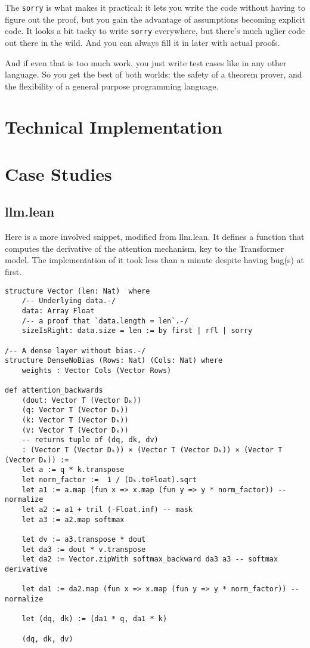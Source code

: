 \documentclass{article}
\begin{document}
The \texttt{sorry} is what makes it practical: it lets you write the code without having to figure out the proof, but you gain the advantage of assumptions becoming explicit code. It looks a bit tacky to write \texttt{sorry} everywhere, but there's much uglier code out there in the wild. And you can always fill it in later with actual proofs.

And if even that is too much work, you just write test cases like in any other language. So you get the best of both worlds: the safety of a theorem prover, and the flexibility of a general purpose programming language.

\section{Technical Implementation}

\section{Case Studies}
\subsection{llm.lean}
Here is a more involved snippet, modified from llm.lean. It defines a function that computes the derivative of the attention mechanism, key to the Transformer model. The implementation of it took less than a minute despite having bug(s) at first.

\begin{verbatim}
structure Vector (len: Nat)  where
    /-- Underlying data.-/
    data: Array Float
    /-- a proof that `data.length = len`.-/
    sizeIsRight: data.size = len := by first | rfl | sorry

/-- A dense layer without bias.-/
structure DenseNoBias (Rows: Nat) (Cols: Nat) where
    weights : Vector Cols (Vector Rows)

def attention_backwards
    (dout: Vector T (Vector Dₖ))
    (q: Vector T (Vector Dₖ))
    (k: Vector T (Vector Dₖ))
    (v: Vector T (Vector Dₖ))
    -- returns tuple of (dq, dk, dv)
    : (Vector T (Vector Dₖ)) × (Vector T (Vector Dₖ)) × (Vector T (Vector Dₖ)) :=
    let a := q * k.transpose
    let norm_factor :=  1 / (Dₖ.toFloat).sqrt
    let a1 := a.map (fun x => x.map (fun y => y * norm_factor)) -- normalize
    let a2 := a1 + tril (-Float.inf) -- mask
    let a3 := a2.map softmax

    let dv := a3.transpose * dout
    let da3 := dout * v.transpose
    let da2 := Vector.zipWith softmax_backward da3 a3 -- softmax derivative

    let da1 := da2.map (fun x => x.map (fun y => y * norm_factor)) -- normalize

    let (dq, dk) := (da1 * q, da1 * k)

    (dq, dk, dv)
\end{verbatim}
\end{document}
